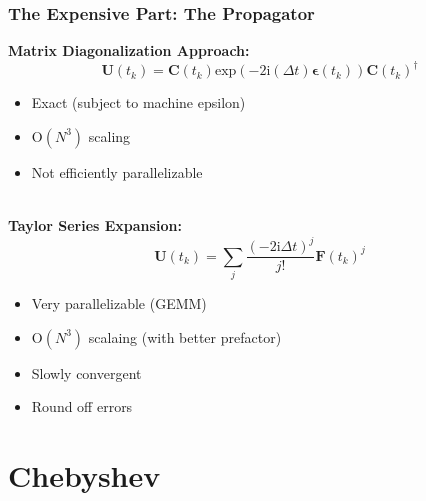 \documentclass{beamer}
\newcommand{\bpar}[1]{\left( #1 \right)}                  %
\renewcommand{\exp}[1]{\mathrm{exp}\bpar{#1}}
\begin{document}
\begin{frame}
\frametitle{The Expensive Part: The Propagator}
\textbf{Matrix Diagonalization Approach:}
\begin{equation*}
\mathbf{U}(t_k) = \mathbf{C}(t_k) \exp{-2\mathrm{i}(\Delta t)\boldsymbol{\epsilon}(t_k)} \mathbf{C}(t_k)^\dagger
\end{equation*}
\vspace{-10pt}
\begin{itemize}
  \color{green}
  \item Exact (subject to machine epsilon)
\end{itemize}
\begin{itemize}
  \color{red}
  \item O$(N^3)$ scaling
  \item Not efficiently parallelizable
\end{itemize}
~\\

\textbf{Taylor Series Expansion:}
\begin{equation*}
\mathbf{U}(t_k) = \sum_{j} \frac{(-2\mathrm{i}\Delta t)^j}{j!}\mathbf{F}(t_k)^j
\end{equation*}
\begin{itemize}
  \color{green}
  \item Very parallelizable (GEMM)
  \item O$(N^3)$ scalaing (with better prefactor)
\end{itemize}
\begin{itemize}
  \color{red}
  \item Slowly convergent 
  \item Round off errors
\end{itemize}

\end{frame}

\section{Chebyshev}
\end{document}
